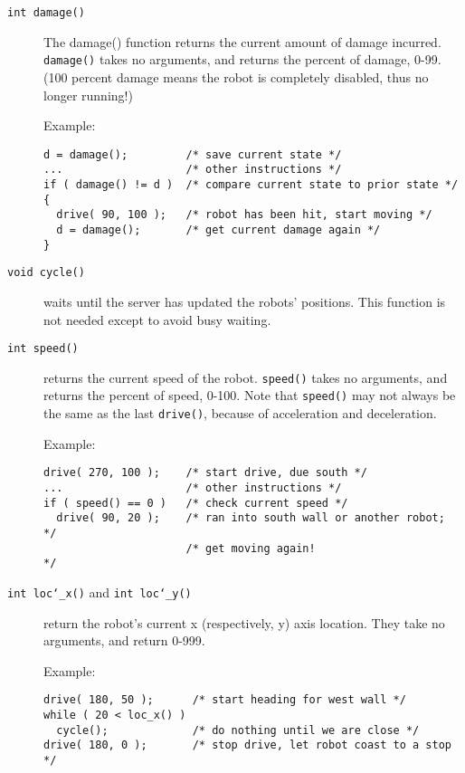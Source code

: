 \documentclass{article}
\def\UL{\char`\_}
\begin{document}
\begin{description}
\item[\texttt{int damage()}]
        The damage() function returns the current amount of damage
        incurred.  \texttt{damage()} takes no arguments, and returns the percent
        of damage, 0-99. (100 percent damage means the robot is
        completely disabled, thus no longer running!) 

        Example:
\begin{verbatim}
d = damage();         /* save current state */
...                   /* other instructions */
if ( damage() != d )  /* compare current state to prior state */
{
  drive( 90, 100 );   /* robot has been hit, start moving */
  d = damage();       /* get current damage again */
} 
\end{verbatim}

\item[\texttt{void cycle()}]
        waits until the server has updated the robots' positions.
        This function is not needed except to avoid busy waiting.

\item[\texttt{int speed()}]
        returns the current speed of the robot.
        \texttt{speed()} takes no arguments, and returns the percent of speed,
        0-100.  Note that \texttt{speed()} may not always be the same as the
        last \texttt{drive()}, because of acceleration and deceleration.

        Example:
\begin{verbatim}
drive( 270, 100 );    /* start drive, due south */
...                   /* other instructions */
if ( speed() == 0 )   /* check current speed */
  drive( 90, 20 );    /* ran into south wall or another robot; */
                      /* get moving again!                     */
\end{verbatim}

\item[\texttt{int loc\UL x()} and \texttt{int loc\UL y()}]
        return the robot's current x (respectively, y) axis location.
        They take no arguments, and return 0-999.

        Example:
\begin{verbatim}
drive( 180, 50 );      /* start heading for west wall */
while ( 20 < loc_x() )
  cycle();             /* do nothing until we are close */
drive( 180, 0 );       /* stop drive, let robot coast to a stop */
\end{verbatim}
\end{description}
\end{document}
